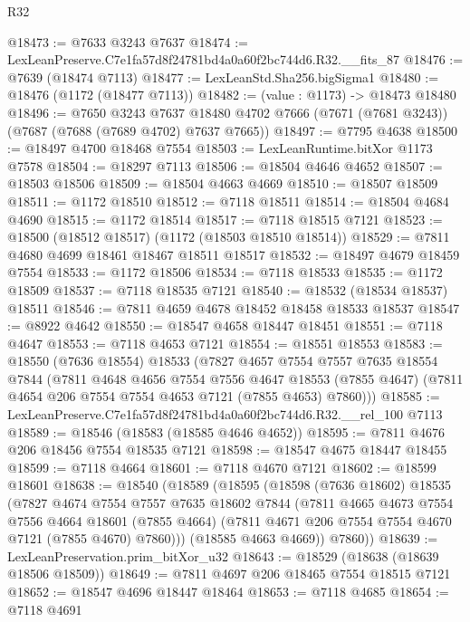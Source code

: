 \begin{lexlean}{R32}
\begin{coremodule}
@18473 := @7633 @3243 @7637
@18474 := LexLeanPreserve.C7e1fa57d8f24781bd4a0a60f2bc744d6.R32.__fits_87
@18476 := @7639 (@18474 @7113)
@18477 := LexLeanStd.Sha256.bigSigma1
@18480 := @18476 (@1172 (@18477 @7113))
@18482 := (value : @1173) -> @18473 @18480
@18496 := @7650
    @3243
    @7637
    @18480
    @4702
    @7666
    (@7671 (@7681 @3243))
    (@7687 (@7688 (@7689 @4702) @7637 @7665))
@18497 := @7795 @4638
@18500 := @18497 @4700 @18468 @7554
@18503 := LexLeanRuntime.bitXor @1173 @7578
@18504 := @18297 @7113
@18506 := @18504 @4646 @4652
@18507 := @18503 @18506
@18509 := @18504 @4663 @4669
@18510 := @18507 @18509
@18511 := @1172 @18510
@18512 := @7118 @18511
@18514 := @18504 @4684 @4690
@18515 := @1172 @18514
@18517 := @7118 @18515 @7121
@18523 := @18500 (@18512 @18517) (@1172 (@18503 @18510 @18514))
@18529 := @7811 @4680 @4699 @18461 @18467 @18511 @18517
@18532 := @18497 @4679 @18459 @7554
@18533 := @1172 @18506
@18534 := @7118 @18533
@18535 := @1172 @18509
@18537 := @7118 @18535 @7121
@18540 := @18532 (@18534 @18537) @18511
@18546 := @7811 @4659 @4678 @18452 @18458 @18533 @18537
@18547 := @8922 @4642
@18550 := @18547 @4658 @18447 @18451
@18551 := @7118 @4647
@18553 := @7118 @4653 @7121
@18554 := @18551 @18553
@18583 := @18550
    (@7636 @18554)
    @18533
    (@7827
      @4657
      @7554
      @7557
      @7635
      @18554
      @7844
      (@7811
        @4648
        @4656
        @7554
        @7556
        @4647
        @18553
        (@7855 @4647)
        (@7811 @4654 @206 @7554 @7554 @4653 @7121 (@7855 @4653) @7860)))
@18585 := LexLeanPreserve.C7e1fa57d8f24781bd4a0a60f2bc744d6.R32.__rel_100 @7113
@18589 := @18546 (@18583 (@18585 @4646 @4652))
@18595 := @7811 @4676 @206 @18456 @7554 @18535 @7121
@18598 := @18547 @4675 @18447 @18455
@18599 := @7118 @4664
@18601 := @7118 @4670 @7121
@18602 := @18599 @18601
@18638 := @18540
    (@18589
      (@18595
        (@18598
          (@7636 @18602)
          @18535
          (@7827
            @4674
            @7554
            @7557
            @7635
            @18602
            @7844
            (@7811
              @4665
              @4673
              @7554
              @7556
              @4664
              @18601
              (@7855 @4664)
              (@7811 @4671 @206 @7554 @7554 @4670 @7121 (@7855 @4670) @7860)))
          (@18585 @4663 @4669))
        @7860))
@18639 := LexLeanPreservation.prim_bitXor_u32
@18643 := @18529 (@18638 (@18639 @18506 @18509))
@18649 := @7811 @4697 @206 @18465 @7554 @18515 @7121
@18652 := @18547 @4696 @18447 @18464
@18653 := @7118 @4685
@18654 := @7118 @4691

\end{coremodule}
\end{lexlean}
